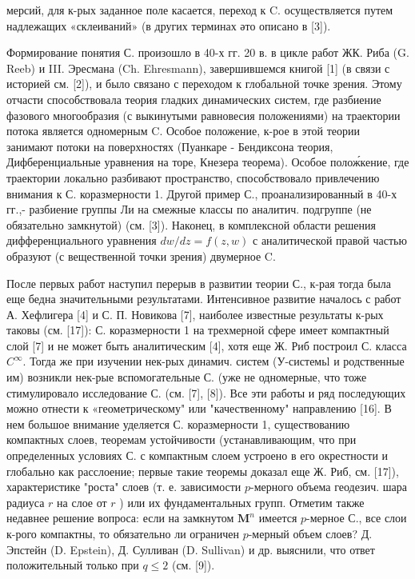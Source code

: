 \documentclass[10pt]{article}
\begin{document}
мерсий, для к-рых заданное поле касается, переход к C. осуществляется путем надлежащих «склеиваний» (в других терминах әто описано в [3]).



Формирование понятия С. произошло в 40-х гг. 20 в. в цикле работ ЖК. Риба (G. Reeb) и III. Эресмана (Ch. Ehresmann), завершившемся книгой [1] (в связи с историей см. [2]), и было связано с переходом к глобальной точке зрения. Этому отчасти способствовала теория гладких динамических систем, где разбиение фазового многообразия (с выкинутыми равновесия положениями) на траектории потока является одномерным $\mathrm{C}$. Особое положение, к-рое в этой теории занимают потоки на поверхностях (Пуанкаре - Бендиксона теория, Дифберенциальные уравнения на торе, Кнезера теорема). Особое полож́кение, где траектории локально разбивают пространство, способствовало привлечению внимания к С. коразмерности 1. Другой пример С., проанализированный в 40-х гг.,- разбиение группы Ли на смежные классы по аналитич. подгруппе (не обязательно замкнутой) (см. [3]). Наконец, в комплексной области решения дифференциального уравнения $d w / d z=f(z, w)$ с аналитической правой частью образуют (с вещественной точки зрения) двумерное $\mathrm{C}$.



После первых работ наступил перерыв в развитии теории С., к-рая тогда была еще бедна значительными результатами. Интенсивное развитие началось с работ А. Хефлигера [4] и С. П. Новикова [7], наиболее известные результаты к-рых таковы (см. [17]): С. коразмерности 1 на трехмерной сфере имеет компактный слой [7] и не может быть аналитическим [4], хотя еще Ж. Риб построил С. класса $C^{\infty}$. Тогда же при изучении нек-рых динамич. систем (У-системьl и родственные им) возникли нек-рые вспомогательные С. (уже не одномерные, что тоже стимулировало исследование С. (см. [7], [8]). Все эти работы и ряд последующих можно отнести к «геометрическому" или "качественному" направлению [16]. В нем большое внимание уделяется С. коразмерности 1, существованию компактных слоев, теоремам устойчивости (устанавливающим, что при определенных условиях С. с компактным слоем устроено в его окрестности и глобально как расслоение; первые такие теоремы доказал еще Ж. Риб, см. [17]), характеристике "роста" слоев (т. е. зависимости $p$-мерного объема геодезич. шара радиуса $r$ на слое от $r$ ) или их фундаментальных групп. Отметим также недавнее решение вопроса: если на замкнутом $\boldsymbol{M}^{n}$ имеется $p$-мерное С., все слои к-рого компактны, то обязательно ли ограничен $p$-мерный объем слоев? Д. Эпстейн (D. Epstein), Д. Сулливан (D. Sullivan) и др. выяснили, что ответ положительный только при $q \leqslant 2$ (см. [9]).
\end{document}
